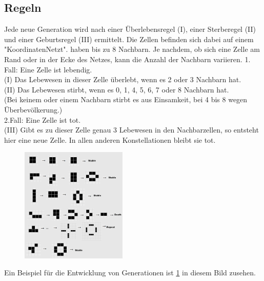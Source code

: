 \documentclass[11pt]{scrartcl}
\begin{document}
\subsection{Regeln}
Jede neue Generation wird nach einer Überlebensregel (I), einer Sterberegel (II) und einer Geburtsregel (III) ermittelt.
Die Zellen befinden sich dabei auf einem "Koordinaten\-Netzt". haben bis zu 8 Nachbarn. Je nachdem, ob sich eine Zelle am Rand oder in der Ecke des Netzes, kann die Anzahl der Nachbarn variieren. 
1. Fall: Eine Zelle ist lebendig.\\ 
(I) Das Lebewesen in dieser Zelle überlebt, wenn es 2 oder 3 Nachbarn hat.\\ 
(II) Das Lebewesen stirbt, wenn es 0, 1, 4, 5, 6, 7 oder 8 Nachbarn hat. \\
(Bei keinem oder einem Nachbarn stirbt es aus Einsamkeit, bei 4 bis 8 wegen Überbevölkerung.)\\
2.Fall: Eine Zelle ist tot.\\ 
(III) Gibt es zu dieser Zelle genau 3 Lebewesen in den Nachbarzellen, so entsteht hier eine neue Zelle. In allen anderen Konstellationen bleibt sie tot.\\
\begin{figure}
\centering
\label{fig:Abb2}
\includegraphics[width=0.45\textwidth]{4life2.png}
\end{figure}
Ein Beispiel für die Entwicklung von Generationen ist \ref{fig:Abb2} in diesem Bild zusehen.
\end{document}

